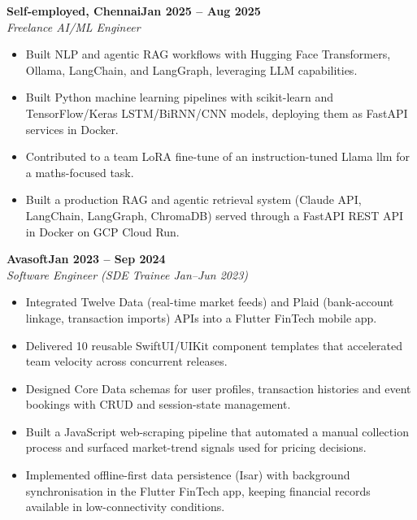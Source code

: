 \documentclass[a4paper,11pt]{article}
\newcommand{\entry}[4]{\needspace{4\baselineskip}\noindent\textbf{#1}\hfill\textbf{#2}\\ \textit{#3}\hfill\textit{#4}\par}
\begin{document}
\vspace{4pt}
\entry{Self-employed, Chennai}{Jan 2025 – Aug 2025}{Freelance AI/ML Engineer}{}
\begin{itemize}
  \item Built NLP and agentic RAG workflows with Hugging Face Transformers, Ollama, LangChain, and LangGraph, leveraging LLM capabilities.
  \item Built Python machine learning pipelines with scikit-learn and TensorFlow/Keras LSTM/BiRNN/CNN models, deploying them as FastAPI services in Docker.
  \item Contributed to a team LoRA fine-tune of an instruction-tuned Llama llm for a maths-focused task.
  \item Built a production RAG and agentic retrieval system (Claude API, LangChain, LangGraph, ChromaDB) served through a FastAPI REST API in Docker on GCP Cloud Run.
\end{itemize}
\vspace{4pt}
\entry{Avasoft}{Jan 2023 – Sep 2024}{Software Engineer (SDE Trainee Jan–Jun 2023)}{}
\begin{itemize}
  \item Integrated Twelve Data (real-time market feeds) and Plaid (bank-account linkage, transaction imports) APIs into a Flutter FinTech mobile app.
  \item Delivered 10 reusable SwiftUI/UIKit component templates that accelerated team velocity across concurrent releases.
  \item Designed Core Data schemas for user profiles, transaction histories and event bookings with CRUD and session-state management.
  \item Built a JavaScript web-scraping pipeline that automated a manual collection process and surfaced market-trend signals used for pricing decisions.
  \item Implemented offline-first data persistence (Isar) with background synchronisation in the Flutter FinTech app, keeping financial records available in low-connectivity conditions.
\end{itemize}

\end{document}
